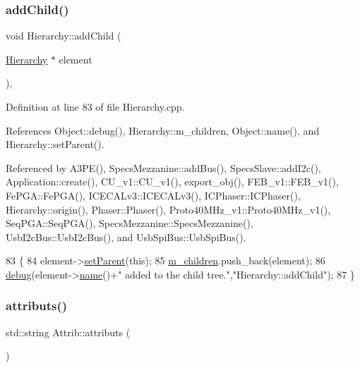 \subsubsection{\texorpdfstring{add\+Child()}{addChild()}}
{\footnotesize\ttfamily void Hierarchy\+::add\+Child (\begin{DoxyParamCaption}\item[{\hyperlink{classHierarchy}{Hierarchy} $\ast$}]{element }\end{DoxyParamCaption})\hspace{0.3cm}{\ttfamily [virtual]}, {\ttfamily [inherited]}}



Definition at line 83 of file Hierarchy.\+cpp.



References Object\+::debug(), Hierarchy\+::m\+\_\+children, Object\+::name(), and Hierarchy\+::set\+Parent().



Referenced by A3\+P\+E(), Specs\+Mezzanine\+::add\+Bus(), Specs\+Slave\+::add\+I2c(), Application\+::create(), C\+U\+\_\+v1\+::\+C\+U\+\_\+v1(), export\+\_\+obj(), F\+E\+B\+\_\+v1\+::\+F\+E\+B\+\_\+v1(), Fe\+P\+G\+A\+::\+Fe\+P\+G\+A(), I\+C\+E\+C\+A\+Lv3\+::\+I\+C\+E\+C\+A\+Lv3(), I\+C\+Phaser\+::\+I\+C\+Phaser(), Hierarchy\+::origin(), Phaser\+::\+Phaser(), Proto40\+M\+Hz\+\_\+v1\+::\+Proto40\+M\+Hz\+\_\+v1(), Seq\+P\+G\+A\+::\+Seq\+P\+G\+A(), Specs\+Mezzanine\+::\+Specs\+Mezzanine(), Usb\+I2c\+Bus\+::\+Usb\+I2c\+Bus(), and Usb\+Spi\+Bus\+::\+Usb\+Spi\+Bus().


\begin{DoxyCode}
83                                           \{
84   element->\hyperlink{classHierarchy_a585ad1aeec16077a0e532ab8b4fc557b}{setParent}(\textcolor{keyword}{this});
85   \hyperlink{classHierarchy_a038816763941fd4a930504917f60483b}{m\_children}.push\_back(element);
86   \hyperlink{classObject_aac010553f022165573714b7014a15f0d}{debug}(element->\hyperlink{classObject_a300f4c05dd468c7bb8b3c968868443c1}{name}()+\textcolor{stringliteral}{" added to the child tree."},\textcolor{stringliteral}{"Hierarchy::addChild"});
87 \}
\end{DoxyCode}
\mbox{\label{classAttrib_aee7bbf16b144887f196e1341b24f8a26}} 
\subsubsection{\texorpdfstring{attributs()}{attributs()}}
{\footnotesize\ttfamily std\+::string Attrib\+::attributs (\begin{DoxyParamCaption}{ }\end{DoxyParamCaption})\hspace{0.3cm}{\ttfamily [inherited]}}


